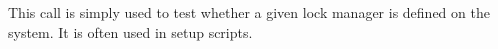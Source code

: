 This call is simply used to test whether a given lock manager is defined on the system. It is often
used in setup scripts.
